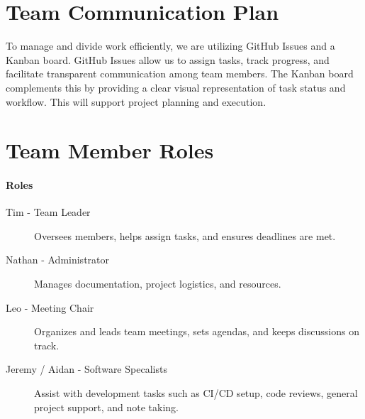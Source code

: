 \documentclass{article}
\begin{document}

\section{Team Communication Plan}


To manage and divide work efficiently, we are utilizing GitHub Issues and a Kanban board. GitHub Issues allow us to assign tasks, track progress, and facilitate transparent communication among team members. The Kanban board complements this by providing a clear visual representation of task status and workflow. This will support project planning and execution.


\section{Team Member Roles}

\paragraph{Roles} 

\begin{description}
    \item[Tim - Team Leader] Oversees members, helps assign tasks, and ensures deadlines are met.
    \item[Nathan - Administrator] Manages documentation, project logistics, and resources.
    \item[Leo - Meeting Chair] Organizes and leads team meetings, sets agendas, and keeps discussions on track.
    \item[Jeremy / Aidan - Software Specalists] Assist with development tasks such as CI/CD setup, code reviews, general project support, and note taking.
\end{description}


\end{document}
